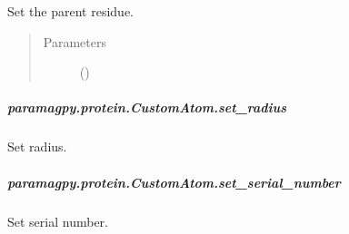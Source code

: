 \documentclass[a4paper,10pt,english,openany,oneside]{sphinxmanual}
\begin{document}
\begin{fulllineitems}
\begin{fulllineitems}
\begin{fulllineitems}
\label{\detokenize{reference/generated/paramagpy.protein.CustomAtom.set_parent:paramagpy.protein.CustomAtom.set_parent}}
\sphinxAtStartPar
Set the parent residue.
\begin{quote}\begin{description}
\item[{Parameters}] \leavevmode
\sphinxAtStartPar
{} () \textendash{} 

\end{description}\end{quote}

\end{fulllineitems}



\subparagraph{paramagpy.protein.CustomAtom.set\_radius}
\label{\detokenize{reference/generated/paramagpy.protein.CustomAtom.set_radius:paramagpy-protein-customatom-set-radius}}\label{\detokenize{reference/generated/paramagpy.protein.CustomAtom.set_radius::doc}}

\begin{fulllineitems}
\label{\detokenize{reference/generated/paramagpy.protein.CustomAtom.set_radius:paramagpy.protein.CustomAtom.set_radius}}
\sphinxAtStartPar
Set radius.

\end{fulllineitems}



\subparagraph{paramagpy.protein.CustomAtom.set\_serial\_number}
\label{\detokenize{reference/generated/paramagpy.protein.CustomAtom.set_serial_number:paramagpy-protein-customatom-set-serial-number}}\label{\detokenize{reference/generated/paramagpy.protein.CustomAtom.set_serial_number::doc}}

\begin{fulllineitems}
\label{\detokenize{reference/generated/paramagpy.protein.CustomAtom.set_serial_number:paramagpy.protein.CustomAtom.set_serial_number}}
\sphinxAtStartPar
Set serial number.


\end{fulllineitems}
\end{fulllineitems}
\end{fulllineitems}
\end{document}
